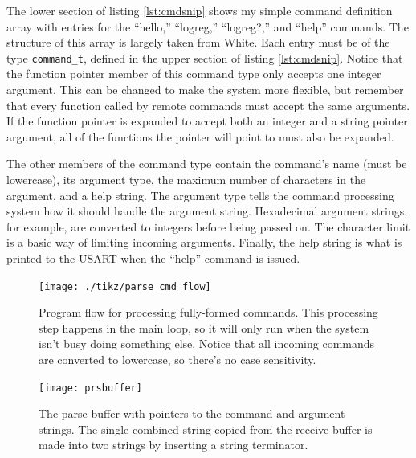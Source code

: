 The lower section of listing \ref{lst:cmdsnip} shows my simple command definition array with entries for the ``hello,'' ``logreg,'' ``logreg?,'' and ``help'' commands. The structure of this array is largely taken from White\cite{bok:white2012}.  Each entry must be of the type \texttt{command\_t}, defined in the upper section of listing \ref{lst:cmdsnip}.  Notice that the function pointer member of this command type only accepts one integer argument.  This can be changed to make the system more flexible, but remember that every function called by remote commands must accept the same arguments.  If the function pointer is expanded to accept both an integer and a string pointer argument, all of the functions the pointer will point to must also be expanded.  

The other members of the command type contain the command's name (must be lowercase), its argument type, the maximum number of characters in the argument, and a help string.  The argument type tells the command processing system how it should handle the argument string.  Hexadecimal argument strings, for example, are converted to integers before being passed on.  The character limit is a basic way of limiting incoming arguments.  Finally, the help string is what is printed to the USART when the ``help'' command is issued.


\begin{figure}[ht]
    \begin{center}
        \texttt{[image: ./tikz/parse\_cmd\_flow]}
        \caption{Program flow for processing fully-formed commands.  This processing step happens in the main loop, so it will only run when the system isn't busy doing something else.  Notice that all incoming commands are converted to lowercase, so there's no case sensitivity.\label{fig:cmdflow}}
    \end{center}
\end{figure}

\begin{figure}[ht]
    \begin{center}
        \texttt{[image: prsbuffer]}
        \caption{The parse buffer with pointers to the command and argument strings.  The single combined string copied from the receive buffer is made into two strings by inserting a string terminator.\label{fig:prsbuffer}}
    \end{center}
\end{figure}

